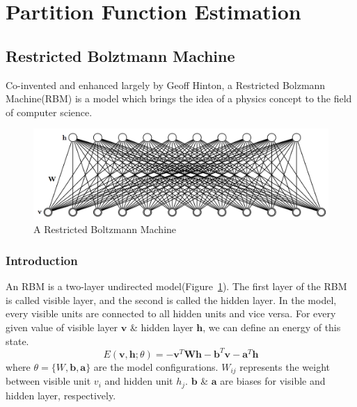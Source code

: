 
\section{Partition Function Estimation} \label{sec:rbm}


\subsection{Restricted Bolztmann Machine}
Co-invented and enhanced largely\cite{hinton2006reducing} by Geoff Hinton, a Restricted Bolzmann Machine(RBM)\cite{mcclelland1987parallel} is a model which brings the idea of a physics concept to the field of computer science.

\begin{figure}[tb]
  	\centering
  	\includegraphics[width=1\textwidth]{figure/rbm.png}
	\caption{A Restricted Boltzmann Machine}
	\label{fig:rbm}
\end{figure}

\subsubsection{Introduction}
An RBM is a two-layer undirected model(Figure~\ref{fig:rbm}). The first layer of the RBM is called visible layer, and the second is called the hidden layer. In the model, every visible units are connected to all hidden units and vice versa. For every given value of visible layer $\mathbf v$ \& hidden layer $\mathbf h$, we can define an energy of this state.
\begin{equation}
E(\mathbf v,\mathbf h;\theta)=-\mathbf v^T\mathbf W\mathbf h-\mathbf b^T\mathbf v-\mathbf a^T\mathbf h
\end{equation}
where $\theta =\{W,\mathbf b,\mathbf a\}$ are the model configurations. $W_{ij}$ represents the weight between visible unit $v_{i}$ and hidden unit $h_{j}$. $\mathbf b$ \& $\mathbf a$ are biases for visible and hidden layer, respectively.

